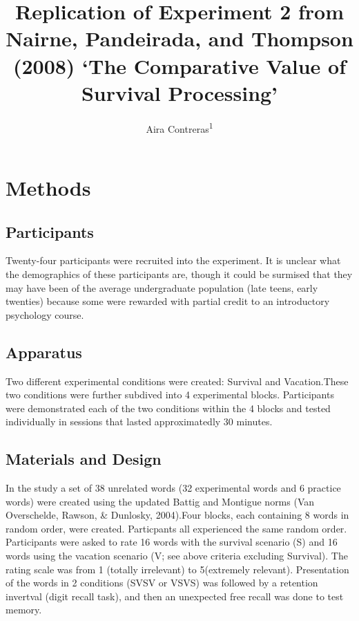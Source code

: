 \documentclass[man]{apa6}
\title{Replication of Experiment 2 from Nairne, Pandeirada, and Thompson (2008) `The Comparative Value of Survival Processing'}
\author{Aira Contreras\textsuperscript{1}}
\date{}
\affiliation{
\vspace{0.5cm}
\textsuperscript{1} Brooklyn College of the City University of New York}
\begin{document}
\maketitle

\hypertarget{methods}{%
\section{Methods}\label{methods}}

\hypertarget{participants}{%
\subsection{Participants}\label{participants}}

Twenty-four participants were recruited into the experiment. It is unclear what the demographics of these participants are, though it could be surmised that they may have been of the average undergraduate population (late teens, early twenties) because some were rewarded with partial credit to an introductory psychology course.

\hypertarget{apparatus}{%
\subsection{Apparatus}\label{apparatus}}

Two different experimental conditions were created: Survival and Vacation.These two conditions were further subdived into 4 experimental blocks. Participants were demonstrated each of the two conditions within the 4 blocks and tested individually in sessions that lasted approximatedly 30 minutes.

\hypertarget{materials-and-design}{%
\subsection{Materials and Design}\label{materials-and-design}}

In the study a set of 38 unrelated words (32 experimental words and 6 practice words) were created using the updated Battig and Montigue norms (Van Overschelde, Rawson, \& Dunlosky, 2004).Four blocks, each containing 8 words in random order, were created. Particpants all experienced the same random order. Participants were asked to rate 16 words with the survival scenario (S) and 16 words using the vacation scenario (V; see above criteria excluding Survival). The rating scale was from 1 (totally irrelevant) to 5(extremely relevant). Presentation of the words in 2 conditions (SVSV or VSVS) was followed by a retention invertval (digit recall task), and then an unexpected free recall was done to test memory.
\end{document}
